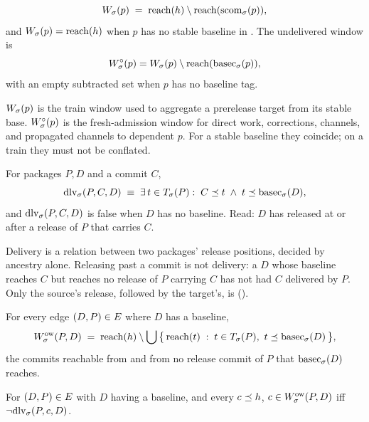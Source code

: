 \begin{definition}
\label{def:window}
\begin{equation}
  W_{\sigma}(p) \;=\; \mathrm{reach}(h) \setminus \mathrm{reach}(\mathrm{scom}_{\sigma}(p)),
  \label{eq:window}
\end{equation}
and $W_{\sigma}(p) = \mathrm{reach}(h)$ when $p$ has no stable baseline in \st{}.
The undelivered window is
\[
  W^{\circ}_{\sigma}(p)=W_{\sigma}(p)\setminus\mathrm{reach}(\mathrm{basec}_{\sigma}(p)),
\]
with an empty subtracted set when $p$ has no baseline tag.
\end{definition}

$W_{\sigma}(p)$ is the train window used to aggregate a prerelease target from
its stable base. $W^{\circ}_{\sigma}(p)$ is the fresh-admission window for direct
work, corrections, channels, and propagated channels to dependent $p$. For a
stable baseline they coincide; on a train they must not be conflated.

\begin{definition}
\label{def:delivery}
For packages $P, D$ and a commit $C$,
\[
  \mathrm{dlv}_{\sigma}(P,C,D) \;\equiv\;
  \exists\, t \in T_{\sigma}(P) :\; C \preceq t \;\land\; t \preceq \mathrm{basec}_{\sigma}(D),
\]
and $\mathrm{dlv}_{\sigma}(P,C,D)$ is false when $D$ has no baseline. Read: $D$ has
released at or after a release of $P$ that carries $C$.
\end{definition}

Delivery is a relation between two packages' release positions, decided by
ancestry alone. Releasing past a commit is not delivery: a $D$ whose baseline
reaches $C$ but reaches no release of $P$ carrying $C$ has not had $C$
delivered by $P$. Only the source's release, followed by the target's, is
().

\begin{definition}
\label{def:owedwindow}
For every edge $(D,P) \in E$ where $D$ has a baseline,
\[
  W^{\mathrm{ow}}_{\sigma}(P,D) \;=\; \mathrm{reach}(h) \setminus
    \bigcup\,\bigl\{\, \mathrm{reach}(t) \;:\; t \in T_{\sigma}(P),\ t \preceq \mathrm{basec}_{\sigma}(D) \,\bigr\},
\]
the commits reachable from \Head{} and from no release commit of $P$ that
$\mathrm{basec}_{\sigma}(D)$ reaches.
\end{definition}

\begin{lemma}
\label{lem:owedwindow}
For $(D,P) \in E$ with $D$ having a baseline, and every $c \preceq h$,
$c \in W^{\mathrm{ow}}_{\sigma}(P,D)$ iff $\lnot\mathrm{dlv}_{\sigma}(P,c,D)$.
\end{lemma}

